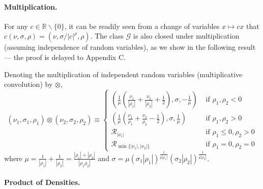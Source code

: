 \documentclass[thesis.tex]{subfiles}
\begin{document}
\paragraph{Multiplication.}
For any $c \in \mathbb{R} \backslash \{0\}$, it can be readily seen from a change of variables $x \mapsto c x$ that $c (\nu, \sigma, \rho) = (\nu, \sigma / |c|^\rho, \rho)$. The class $\mathcal{G}$ is also closed under multiplication (assuming independence of random variables), as we show in the following result --- the proof is delayed to Appendix C.
\begin{proposition}
\label{prop:Mult}
Denoting the multiplication of independent random variables (multiplicative convolution) by $\otimes$,
\[
(\nu_{1},\sigma_{1},\rho_{1})\otimes(\nu_{2},\sigma_{2},\rho_{2})
\equiv\begin{cases}
\left(\frac{1}{\mu}\left(\frac{\nu_{1}}{|\rho_{1}|}+\frac{\nu_{2}}{|\rho_{2}|}+\frac{1}{2}\right),\sigma,-\frac{1}{\mu}\right) & \text{ if }\rho_{1},\rho_{2}<0\\
\left(\frac{1}{\mu}\left(\frac{\nu_{1}}{\rho_{1}}+\frac{\nu_{2}}{\rho_{2}}-\frac{1}{2}\right),\sigma,\frac{1}{\mu}\right) & \text{ if }\rho_{1},\rho_{2}>0\\
\mathcal{R}_{|\nu_1|} & \mbox{ if }\rho_{1}\leq0,\rho_{2}>0 \\
\mathcal{R}_{\min\{|\nu_1|,|\nu_2|\}} & \mbox{ if }\rho_{1}=0,\rho_{2}=0
\end{cases}
\]
where $\mu=\frac{1}{|\rho_{1}|}+\frac{1}{|\rho_{2}|}=\frac{|\rho_{1}|+|\rho_{2}|}{|\rho_{1}\rho_{2}|}$ and $\sigma=\mu(\sigma_{1}|\rho_{1}|)^{\frac{1}{\mu|\rho_{1}|}}(\sigma_{2}|\rho_{2}|)^{\frac{1}{\mu|\rho_{2}|}}$. 
\end{proposition}



\paragraph{Product of Densities.}
\end{document}
